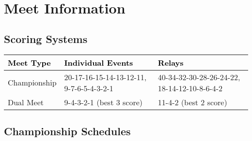 
\section{Meet Information}


\subsection*{Scoring Systems}

\begin{table}[H]
\centering
\renewcommand{\arraystretch}{1.4}
\begin{tabular}{p{3.5cm} p{5cm} p{5.5cm}}
\toprule
\rowcolor{teamprimary!25}
\textbf{\textcolor{black}{Meet Type}} & \textbf{\textcolor{black}{Individual Events}} & \textbf{\textcolor{black}{Relays}} \\
\midrule
\rowcolor{teamsecondary!15}
Championship & 20-17-16-15-14-13-12-11, 9-7-6-5-4-3-2-1 & 40-34-32-30-28-26-24-22, 18-14-12-10-8-6-4-2 \\
\rowcolor{teamprimary!10}
Dual Meet & 9-4-3-2-1 (best 3 score) & 11-4-2 (best 2 score) \\
\bottomrule
\end{tabular}
\end{table}


\subsection*{Championship Schedules}

